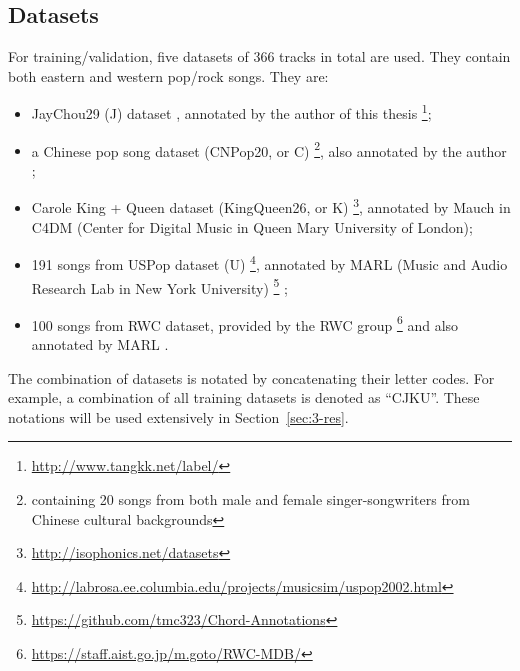 \subsection{Datasets}
For training/validation, five datasets of 366 tracks in total are used. They contain both eastern and western pop/rock songs. They are:
\begin{itemize}
\item JayChou29 (J) dataset \cite{deng2016chord}, annotated by the author of this thesis \footnote{\url{http://www.tangkk.net/label/}};
\item a Chinese pop song dataset (CNPop20, or C) \footnote{containing 20 songs from both male and female singer-songwriters from Chinese cultural backgrounds}, also annotated by the author \cite{deng2016hybrid};
\item Carole King + Queen dataset (KingQueen26, or K) \footnote{\url{http://isophonics.net/datasets}}, annotated by Mauch \cite{mauch2009omras2} in C4DM (Center for Digital Music in Queen Mary University of London);
\item 191 songs from USPop dataset (U) \footnote{\url{http://labrosa.ee.columbia.edu/projects/musicsim/uspop2002.html}}, annotated by MARL (Music and Audio Research Lab in New York University) \footnote{\url{https://github.com/tmc323/Chord-Annotations}} \cite{cho2014improved};
\item 100 songs from RWC dataset, provided by the RWC group \footnote{\url{https://staff.aist.go.jp/m.goto/RWC-MDB/}} and also annotated by MARL \cite{cho2014improved}.
\end{itemize}
The combination of datasets is notated by concatenating their letter codes. For example, a combination of all training datasets is denoted as ``CJKU''. These notations will be used extensively in Section~\ref{sec:3-res}.

